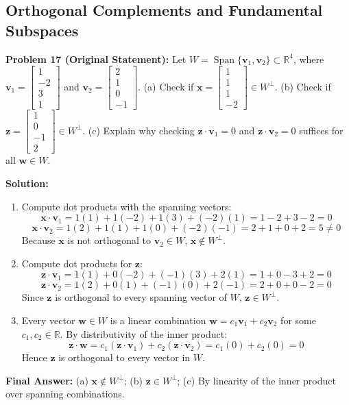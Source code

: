 \documentclass[11pt, letterpaper]{article}
\theoremstyle{definition}
\theoremstyle{remark}
\begin{document}
\subsection{Orthogonal Complements and Fundamental Subspaces}

\textbf{Problem 17 (Original Statement):} Let $W = \operatorname{Span}\{\mathbf{v}_1, \mathbf{v}_2\} \subset \mathbb{R}^4$, where $\mathbf{v}_1 = \begin{bmatrix} 1 \\ -2 \\ 3 \\ 1 \end{bmatrix}$ and $\mathbf{v}_2 = \begin{bmatrix} 2 \\ 1 \\ 0 \\ -1 \end{bmatrix}$. (a) Check if $\mathbf{x} = \begin{bmatrix} 1 \\ 1 \\ 1 \\ -2 \end{bmatrix} \in W^{\perp}$. (b) Check if $\mathbf{z} = \begin{bmatrix} 1 \\ 0 \\ -1 \\ 2 \end{bmatrix} \in W^{\perp}$. (c) Explain why checking $\mathbf{z} \cdot \mathbf{v}_1 = 0$ and $\mathbf{z} \cdot \mathbf{v}_2 = 0$ suffices for all $\mathbf{w} \in W$.

\textbf{Solution:}
\begin{enumerate}[label=(\alph*)]
    \item Compute dot products with the spanning vectors:
    \[
    \mathbf{x} \cdot \mathbf{v}_1 = 1(1) + 1(-2) + 1(3) + (-2)(1) = 1 - 2 + 3 - 2 = 0
    \]
    \[
    \mathbf{x} \cdot \mathbf{v}_2 = 1(2) + 1(1) + 1(0) + (-2)(-1) = 2 + 1 + 0 + 2 = 5 \neq 0
    \]
    Because $\mathbf{x}$ is not orthogonal to $\mathbf{v}_2 \in W$, $\mathbf{x} \notin W^{\perp}$.
    \item Compute dot products for $\mathbf{z}$:
    \[
    \mathbf{z} \cdot \mathbf{v}_1 = 1(1) + 0(-2) + (-1)(3) + 2(1) = 1 + 0 - 3 + 2 = 0
    \]
    \[
    \mathbf{z} \cdot \mathbf{v}_2 = 1(2) + 0(1) + (-1)(0) + 2(-1) = 2 + 0 + 0 - 2 = 0
    \]
    Since $\mathbf{z}$ is orthogonal to every spanning vector of $W$, $\mathbf{z} \in W^{\perp}$.
    \item Every vector $\mathbf{w} \in W$ is a linear combination $\mathbf{w} = c_1\mathbf{v}_1 + c_2\mathbf{v}_2$ for some $c_1, c_2 \in \mathbb{R}$. By distributivity of the inner product:
    \[
    \mathbf{z} \cdot \mathbf{w} = c_1(\mathbf{z} \cdot \mathbf{v}_1) + c_2(\mathbf{z} \cdot \mathbf{v}_2) = c_1(0) + c_2(0) = 0
    \]
    Hence $\mathbf{z}$ is orthogonal to every vector in $W$.
\end{enumerate}
\textbf{Final Answer:} (a) $\mathbf{x} \notin W^{\perp}$; (b) $\mathbf{z} \in W^{\perp}$; (c) By linearity of the inner product over spanning combinations.
\end{document}
